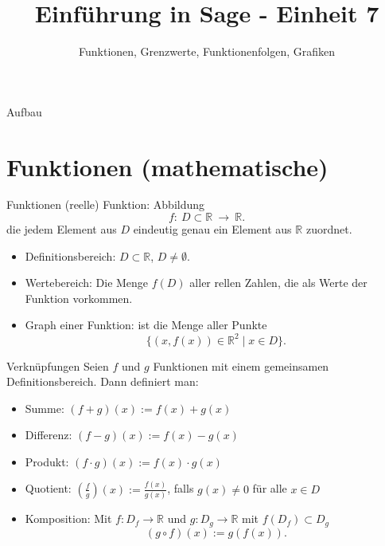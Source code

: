 \documentclass[notes=hide,hyperref={dvipdfmx,pdfpagelabels=false}]{beamer}
\title{Einführung in Sage - Einheit 7}
\subtitle{Funktionen, Grenzwerte, Funktionenfolgen, Grafiken}
\begin{document}
\maketitle

\begin{frame}{Aufbau}
\tableofcontents
\end{frame}


\section{Funktionen (mathematische)}

\begin{frame}{Funktionen}
(reelle) {\color{red} Funktion}:  Abbildung
\[f: \ D \subset \mathbb{R} \ \rightarrow \ \mathbb{R}.\]
die jedem Element aus $D$ eindeutig genau ein Element aus $\mathbb{R}$ zuordnet.
\begin{itemize}
 \item {\color{red} Definitionsbereich}: $D \subset \mathbb{R}$, $D \neq \emptyset$.
\item \alert{Wertebereich}: Die Menge $f(D)$ aller rellen Zahlen, die als Werte der
Funktion vorkommen.
\item {\color{red} Graph} einer Funktion: ist die Menge aller Punkte 
\[ \{ (x,f(x)) \in \mathbb{R}^2 \;|\; x \in D\}. \]
\end{itemize}
\end{frame}

\begin{frame}[fragile]{Verknüpfungen}
Seien $f$ und $g$ Funktionen mit einem gemeinsamen Definitionsbereich. Dann
definiert man:
\begin{itemize}
\item Summe: $(f+g)(x):=f(x)+g(x)$
\item Differenz: $(f-g)(x):=f(x)-g(x)$
\item Produkt: $(f\cdot g)(x):=f(x) \cdot g(x)$
\item Quotient: $(\frac{f}{g})(x):=\frac{f(x)}{g(x)}$, falls $g(x) \neq
0$ für alle $x \in D$ 
\item Komposition: Mit $f:D_f \rightarrow \mathbb{R}$ und $g:D_g \rightarrow \mathbb{R}$
mit $f(D_f) \subset D_g$ 
\[(g \circ f) (x):=g(f(x)).\] 
\end{itemize}

\end{frame}
\end{document}
